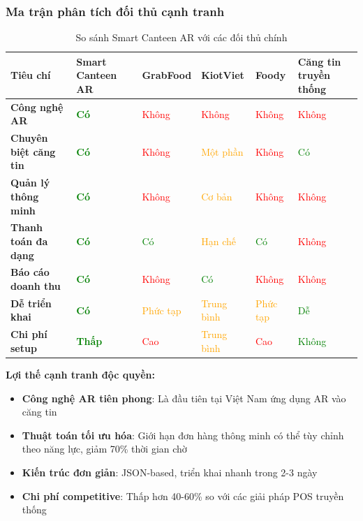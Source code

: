 \documentclass[12pt,a4paper]{article}
\begin{document}
\subsubsection{Ma trận phân tích đối thủ cạnh tranh}

\begin{table}[H]
\centering
\caption{So sánh Smart Canteen AR với các đối thủ chính}
\label{tab:competitor-analysis}
\begin{tabular}{@{}>{\raggedright\arraybackslash}p{3cm}>{\raggedright\arraybackslash}p{2.2cm}>{\raggedright\arraybackslash}p{2.2cm}>{\raggedright\arraybackslash}p{2cm}>{\raggedright\arraybackslash}p{1.8cm}>{\raggedright\arraybackslash}p{2.5cm}@{}}
\toprule
\textbf{Tiêu chí} & \textbf{Smart Canteen AR} & \textbf{GrabFood} & \textbf{KiotViet} & \textbf{Foody} & \textbf{Căng tin truyền thống} \\
\midrule
\textbf{Công nghệ AR} & \textcolor{green}{\textbf{Có}} & \textcolor{red}{Không} & \textcolor{red}{Không} & \textcolor{red}{Không} & \textcolor{red}{Không} \\
\textbf{Chuyên biệt căng tin} & \textcolor{green}{\textbf{Có}} & \textcolor{red}{Không} & \textcolor{orange}{Một phần} & \textcolor{red}{Không} & \textcolor{green}{Có} \\
\textbf{Quản lý thông minh} & \textcolor{green}{\textbf{Có}} & \textcolor{red}{Không} & \textcolor{orange}{Cơ bản} & \textcolor{red}{Không} & \textcolor{red}{Không} \\
\textbf{Thanh toán đa dạng} & \textcolor{green}{\textbf{Có}} & \textcolor{green}{Có} & \textcolor{orange}{Hạn chế} & \textcolor{green}{Có} & \textcolor{red}{Không} \\
\textbf{Báo cáo doanh thu} & \textcolor{green}{\textbf{Có}} & \textcolor{red}{Không} & \textcolor{green}{Có} & \textcolor{red}{Không} & \textcolor{red}{Không} \\
\textbf{Dễ triển khai} & \textcolor{green}{\textbf{Có}} & \textcolor{orange}{Phức tạp} & \textcolor{orange}{Trung bình} & \textcolor{orange}{Phức tạp} & \textcolor{green}{Dễ} \\
\textbf{Chi phí setup} & \textcolor{green}{\textbf{Thấp}} & \textcolor{red}{Cao} & \textcolor{orange}{Trung bình} & \textcolor{red}{Cao} & \textcolor{green}{Không} \\
\bottomrule
\end{tabular}
\end{table}

\textbf{Lợi thế cạnh tranh độc quyền:}
\begin{itemize}[leftmargin=1cm]
    \item \textbf{Công nghệ AR tiên phong}: Là đầu tiên tại Việt Nam ứng dụng AR vào căng tin
    \item \textbf{Thuật toán tối ưu hóa}: Giới hạn đơn hàng thông minh có thể tùy chỉnh theo năng lực, giảm 70\% thời gian chờ
    \item \textbf{Kiến trúc đơn giản}: JSON-based, triển khai nhanh trong 2-3 ngày
    \item \textbf{Chi phí competitive}: Thấp hơn 40-60\% so với các giải pháp POS truyền thống
\end{itemize}
\end{document}
